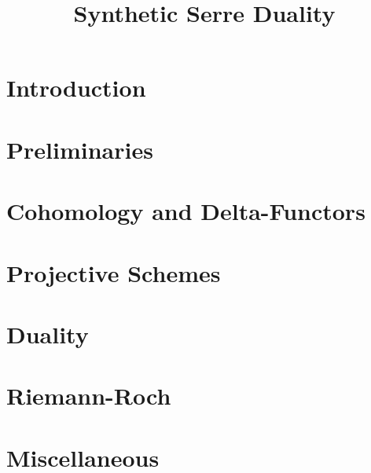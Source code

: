 \documentclass{../util/zariski-small}
\title{Synthetic Serre Duality}
\begin{document}
\author{}

\maketitle


\tableofcontents

\section*{Introduction}


\section{Preliminaries}


\section{Cohomology and Delta-Functors}


\section{Projective Schemes}


\section{Duality}


\section{Riemann-Roch}


\appendix
\section{Miscellaneous}


\printbibliography
\end{document}
